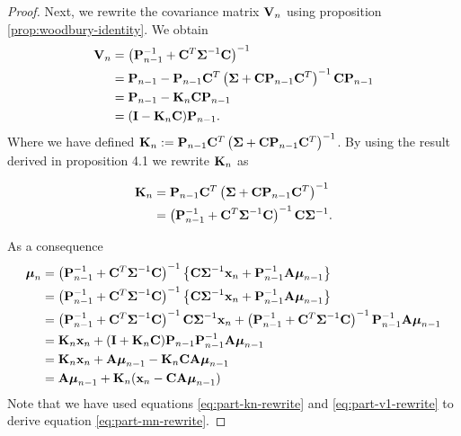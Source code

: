 \documentclass[11pt]{article}
\numberwithin{equation}{section}
\newcommand{\x}{{\bf x}}
\begin{document}
\begin{proof}
	Next, we rewrite the covariance matrix ${\bf V}_n$ using proposition \ref{prop:woodbury-identity}. We obtain
	\begin{align}
		{\bf V}_n &= \left({\bf P}_{n-1}^{-1} + {\bf C}^T \boldsymbol\Sigma^{-1}{\bf C}\right)^{-1} \\
				  &= {\bf P}_{n-1} - {\bf P}_{n-1} {\bf C}^T\left(\boldsymbol\Sigma + {\bf C}{\bf P}_{n-1}{\bf C}^T\right)^{-1}{\bf C}{\bf P}_{n-1} \\
				  &= {\bf P}_{n-1} - {\bf K}_n{\bf C}{\bf P}_{n-1} \\
				  &= ({\bf I}- {\bf K}_n{\bf C}){\bf P}_{n-1}.
	\end{align}
	Where we have defined ${\bf K}_n := {\bf P}_{n-1} {\bf C}^T\left(\boldsymbol\Sigma + {\bf C}{\bf P}_{n-1}{\bf C}^T\right)^{-1}$. By using the result derived in proposition 4.1 we rewrite ${\bf K}_n$ as
	
	\begin{align}
		{\bf K}_n &= {\bf P}_{n-1} {\bf C}^T\left(\boldsymbol\Sigma + {\bf C}{\bf P}_{n-1}{\bf C}^T\right)^{-1} \\
				  &= \left({\bf P}_{n-1}^{-1} + {\bf C}^T\boldsymbol\Sigma^{-1}{\bf C}\right)^{-1}{\bf C}\boldsymbol\Sigma^{-1}. \label{eq:part-kn-rewrite}
	\end{align}
	
	As a consequence
	\begin{align}
		\boldsymbol{\mu}_n &= \left({\bf P}_{n-1}^{-1} + {\bf C}^T \boldsymbol\Sigma^{-1}{\bf C}\right)^{-1} \left\{{\bf C}\boldsymbol\Sigma^{-1}\x_n + {\bf P}_{n-1}^{-1}{\bf A}\boldsymbol\mu_{n-1}\right\}\\
		&= \left({\bf P}_{n-1}^{-1} + {\bf C}^T \boldsymbol\Sigma^{-1}{\bf C}\right)^{-1} \left\{{\bf C}\boldsymbol\Sigma^{-1}\x_n + {\bf P}_{n-1}^{-1}{\bf A}\boldsymbol\mu_{n-1}\right\}\\
		&= \left({\bf P}_{n-1}^{-1} + {\bf C}^T \boldsymbol\Sigma^{-1}{\bf C}\right)^{-1} {\bf C}\boldsymbol\Sigma^{-1}\x_n + \left({\bf P}_{n-1}^{-1} + {\bf C}^T \boldsymbol\Sigma^{-1}{\bf C}\right)^{-1}{\bf P}_{n-1}^{-1}{\bf A}\boldsymbol\mu_{n-1}\\
		&= 	{\bf K}_n \x_n + ({\bf I} + {\bf K}_n {\bf C}){\bf P}_{n-1}{\bf P}_{n-1}^{-1}{\bf A}\boldsymbol\mu_{n-1} \label{eq:part-mn-rewrite}\\
		&= {\bf K}_n \x_n + {\bf A}\boldsymbol\mu_{n-1} - {\bf K}_n {\bf C}{\bf A}\boldsymbol\mu_{n-1}\\
		&= {\bf A}\boldsymbol{\mu}_{n-1} + {\bf K}_{n}(\x_n - {\bf CA}\boldsymbol\mu_{n-1})
	\end{align}
	Note that we have used equations \ref{eq:part-kn-rewrite} and \ref{eq:part-v1-rewrite} to derive equation \ref{eq:part-mn-rewrite}.
	

\end{proof}
\end{document}
